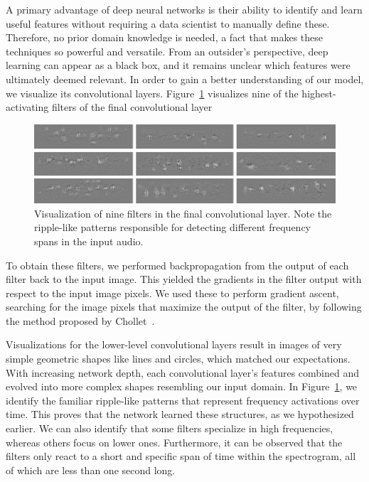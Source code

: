 A primary advantage of deep neural networks is their ability to identify and learn useful features without requiring a data scientist to manually define these. Therefore, no prior domain knowledge is needed, a fact that makes these techniques so powerful and versatile. From an outsider's perspective, deep learning can appear as a black box, and it remains unclear which features were ultimately deemed relevant. In order to gain a better understanding of our model, we visualize its convolutional layers. Figure~\ref{fig:conv_filter} visualizes nine of the highest-activating filters of the final convolutional layer
%
	\begin{figure}[bp]
  		\centering
    	\includegraphics{img/conv_filter.pdf}
    	\caption{Visualization of nine filters in the final convolutional layer. Note the ripple-like patterns responsible for detecting different frequency spans in the input audio.}
    	\label{fig:conv_filter}
	\end{figure}
%
To obtain these filters, we performed backpropagation from the output of each filter back to the input image. This yielded the gradients in the filter output with respect to the input image pixels. We used these to perform gradient ascent, searching for the image pixels that maximize the output of the filter, by following the method proposed by Chollet~\cite{chol16}.


Visualizations for the lower-level convolutional layers result in images of very simple geometric shapes like lines and circles, which matched our expectations. With increasing network depth, each convolutional layer's features combined and evolved into more complex shapes resembling our input domain. In Figure~\ref{fig:conv_filter}, we identify the familiar ripple-like patterns that represent frequency activations over time. This proves that the network learned these structures, as we hypothesized earlier. We can also identify that some filters specialize in high frequencies, whereas others focus on lower ones. Furthermore, it can be observed that the filters only react to a short and specific span of time within the spectrogram, all of which are less than one second long.

